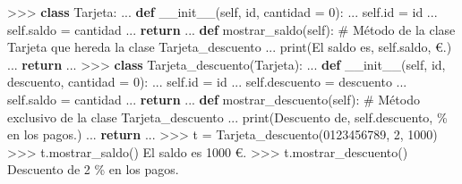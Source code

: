\documentclass[
  spanish,
  a4paper,
]{scrreport}
\newenvironment{Shaded}{\begin{snugshade}}{\end{snugshade}}
\newcommand{\BuiltInTok}[1]{\textcolor[rgb]{0.00,0.23,0.31}{#1}}
\newcommand{\CommentTok}[1]{\textcolor[rgb]{0.37,0.37,0.37}{#1}}
\newcommand{\ControlFlowTok}[1]{\textcolor[rgb]{0.00,0.23,0.31}{\textbf{#1}}}
\newcommand{\DecValTok}[1]{\textcolor[rgb]{0.68,0.00,0.00}{#1}}
\newcommand{\FunctionTok}[1]{\textcolor[rgb]{0.28,0.35,0.67}{#1}}
\newcommand{\KeywordTok}[1]{\textcolor[rgb]{0.00,0.23,0.31}{\textbf{#1}}}
\newcommand{\NormalTok}[1]{\textcolor[rgb]{0.00,0.23,0.31}{#1}}
\newcommand{\OperatorTok}[1]{\textcolor[rgb]{0.37,0.37,0.37}{#1}}
\newcommand{\SpecialCharTok}[1]{\textcolor[rgb]{0.37,0.37,0.37}{#1}}
\newcommand{\StringTok}[1]{\textcolor[rgb]{0.13,0.47,0.30}{#1}}
\newcommand{\VariableTok}[1]{\textcolor[rgb]{0.07,0.07,0.07}{#1}}
\begin{document}
\begin{Shaded}
\begin{Highlighting}[]
\OperatorTok{\textgreater{}\textgreater{}\textgreater{}} \KeywordTok{class}\NormalTok{ Tarjeta:}
\NormalTok{...     }\KeywordTok{def} \FunctionTok{\_\_init\_\_}\NormalTok{(}\VariableTok{self}\NormalTok{, }\BuiltInTok{id}\NormalTok{, cantidad }\OperatorTok{=} \DecValTok{0}\NormalTok{):}
\NormalTok{...         }\VariableTok{self}\NormalTok{.}\BuiltInTok{id} \OperatorTok{=} \BuiltInTok{id}
\NormalTok{...         }\VariableTok{self}\NormalTok{.saldo }\OperatorTok{=}\NormalTok{ cantidad}
\NormalTok{...         }\ControlFlowTok{return}
\NormalTok{...     }\KeywordTok{def}\NormalTok{ mostrar\_saldo(}\VariableTok{self}\NormalTok{):       }\CommentTok{\# Método de la clase Tarjeta que hereda la clase Tarjeta\_descuento}
\NormalTok{...         }\BuiltInTok{print}\NormalTok{(}\StringTok{\textquotesingle{}El saldo es\textquotesingle{}}\NormalTok{,  }\VariableTok{self}\NormalTok{.saldo, }\StringTok{\textquotesingle{}€.\textquotesingle{}}\NormalTok{)}
\NormalTok{...         }\ControlFlowTok{return}
\NormalTok{... }
\OperatorTok{\textgreater{}\textgreater{}\textgreater{}} \KeywordTok{class}\NormalTok{ Tarjeta\_descuento(Tarjeta):}
\NormalTok{...     }\KeywordTok{def} \FunctionTok{\_\_init\_\_}\NormalTok{(}\VariableTok{self}\NormalTok{, }\BuiltInTok{id}\NormalTok{, descuento, cantidad }\OperatorTok{=} \DecValTok{0}\NormalTok{):}
\NormalTok{...         }\VariableTok{self}\NormalTok{.}\BuiltInTok{id} \OperatorTok{=} \BuiltInTok{id}
\NormalTok{...         }\VariableTok{self}\NormalTok{.descuento }\OperatorTok{=}\NormalTok{ descuento}
\NormalTok{...         }\VariableTok{self}\NormalTok{.saldo }\OperatorTok{=}\NormalTok{ cantidad}
\NormalTok{...         }\ControlFlowTok{return}
\NormalTok{...     }\KeywordTok{def}\NormalTok{ mostrar\_descuento(}\VariableTok{self}\NormalTok{):   }\CommentTok{\# Método exclusivo de la clase Tarjeta\_descuento}
\NormalTok{...         }\BuiltInTok{print}\NormalTok{(}\StringTok{\textquotesingle{}Descuento de\textquotesingle{}}\NormalTok{, }\VariableTok{self}\NormalTok{.descuento, }\StringTok{\textquotesingle{}}\SpecialCharTok{\% e}\StringTok{n los pagos.\textquotesingle{}}\NormalTok{)}
\NormalTok{...         }\ControlFlowTok{return}
\NormalTok{... }
\OperatorTok{\textgreater{}\textgreater{}\textgreater{}}\NormalTok{ t }\OperatorTok{=}\NormalTok{ Tarjeta\_descuento(}\StringTok{\textquotesingle{}0123456789\textquotesingle{}}\NormalTok{, }\DecValTok{2}\NormalTok{, }\DecValTok{1000}\NormalTok{)}
\OperatorTok{\textgreater{}\textgreater{}\textgreater{}}\NormalTok{ t.mostrar\_saldo()}
\NormalTok{El saldo es }\DecValTok{1000}\NormalTok{ €.}
\OperatorTok{\textgreater{}\textgreater{}\textgreater{}}\NormalTok{ t.mostrar\_descuento()}
\NormalTok{Descuento de }\DecValTok{2} \OperatorTok{\%}\NormalTok{ en los pagos.}
\end{Highlighting}
\end{Shaded}
\end{document}
